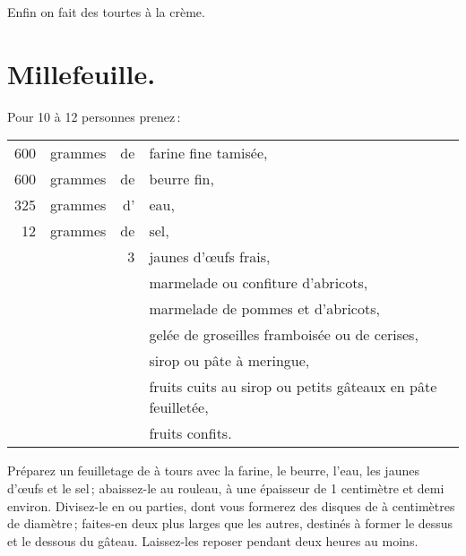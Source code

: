 \sk

Enfin on fait des tourtes à la crème.

\section*{\centering Millefeuille.}
{}

Pour 10 à 12 personnes prenez :

\footnotesize
\begin{longtable}{rrrp{16em}}
    600 & grammes & de & farine fine tamisée,                                                             \\
    600 & grammes & de & beurre fin,                                                                      \\
    325 & grammes & d' & eau,                                                                             \\
     12 & grammes & de & sel,                                                                             \\
        &         &  3 & jaunes d'œufs frais,                                                             \\
        &         &    &  marmelade ou confiture d'abricots,                                              \\
        &         &    &  marmelade de pommes et d'abricots,                                              \\
        &         &    &  gelée de groseilles framboisée ou de cerises,                                   \\
        &         &    &  sirop ou pâte à meringue,                                                       \\
        &         &    &  fruits cuits au sirop ou petits gâteaux en pâte feuilletée,                     \\
        &         &    &  fruits confits.                                                                 \\
\end{longtable}
\normalsize

Préparez un feuilletage de {\mmm} à {\mmm} tours avec la farine, le
beurre, l'eau, les jaunes d'œufs et le sel ; abaissez-le au rouleau, à une
épaisseur de 1 centimètre et demi environ. Divisez-le en {\mmm} ou
{\mmm} parties, dont vous formerez des disques de {\mmm}
à {\mmm} centimètres de diamètre ; faites-en deux plus larges que les
autres, destinés à former le dessus et le dessous du gâteau. Laissez-les
reposer pendant deux heures au moins.

